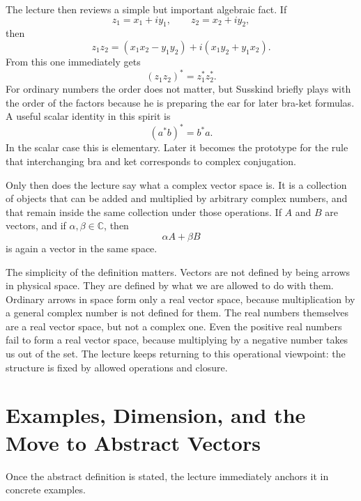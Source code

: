 The lecture then reviews a simple but important algebraic fact. If
\begin{equation}
z_1 = x_1 + i y_1,
\qquad
z_2 = x_2 + i y_2,
\end{equation}
then
\begin{equation}
z_1 z_2
=
(x_1x_2 - y_1y_2) + i(x_1y_2 + y_1x_2).
\end{equation}
From this one immediately gets
\begin{equation}
(z_1 z_2)^* = z_1^* z_2^*.
\end{equation}
For ordinary numbers the order does not matter, but Susskind briefly plays with the order of the factors because he is preparing the ear for later bra-ket formulas. A useful scalar identity in this spirit is
\begin{equation}
(a^* b)^* = b^* a.
\end{equation}
In the scalar case this is elementary. Later it becomes the prototype for the rule that interchanging bra and ket corresponds to complex conjugation.

Only then does the lecture say what a complex vector space is. It is a collection of objects that can be added and multiplied by arbitrary complex numbers, and that remain inside the same collection under those operations. If \(A\) and \(B\) are vectors, and if \(\alpha,\beta \in \mathbb{C}\), then
\begin{equation}
\alpha A + \beta B
\end{equation}
is again a vector in the same space.

The simplicity of the definition matters. Vectors are not defined by being arrows in physical space. They are defined by what we are allowed to do with them. Ordinary arrows in space form only a real vector space, because multiplication by a general complex number is not defined for them. The real numbers themselves are a real vector space, but not a complex one. Even the positive real numbers fail to form a real vector space, because multiplying by a negative number takes us out of the set. The lecture keeps returning to this operational viewpoint: the structure is fixed by allowed operations and closure.

\section{Examples, Dimension, and the Move to Abstract Vectors}

Once the abstract definition is stated, the lecture immediately anchors it in concrete examples.

